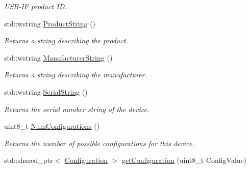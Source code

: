 \begin{DoxyCompactItemize}
\begin{DoxyCompactList}\small\item\em U\-S\-B-\/\-I\-F product I\-D. \end{DoxyCompactList}\item 
\hypertarget{class_lib_u_s_b_1_1_device_a2675fa27b241d017e20a20bd7d7a8af9}{std\-::wstring \hyperlink{class_lib_u_s_b_1_1_device_a2675fa27b241d017e20a20bd7d7a8af9}{Product\-String} ()}\label{class_lib_u_s_b_1_1_device_a2675fa27b241d017e20a20bd7d7a8af9}

\begin{DoxyCompactList}\small\item\em Returns a string describing the product. \end{DoxyCompactList}\item 
\hypertarget{class_lib_u_s_b_1_1_device_a8bdf8188d169b78b6042acdace38029d}{std\-::wstring \hyperlink{class_lib_u_s_b_1_1_device_a8bdf8188d169b78b6042acdace38029d}{Manufacturer\-String} ()}\label{class_lib_u_s_b_1_1_device_a8bdf8188d169b78b6042acdace38029d}

\begin{DoxyCompactList}\small\item\em Returns a string describing the manufacturer. \end{DoxyCompactList}\item 
\hypertarget{class_lib_u_s_b_1_1_device_aab1bf4b42123fe6e83614e49a95c4fcf}{std\-::wstring \hyperlink{class_lib_u_s_b_1_1_device_aab1bf4b42123fe6e83614e49a95c4fcf}{Serial\-String} ()}\label{class_lib_u_s_b_1_1_device_aab1bf4b42123fe6e83614e49a95c4fcf}

\begin{DoxyCompactList}\small\item\em Returns the serial number string of the device. \end{DoxyCompactList}\item 
\hypertarget{class_lib_u_s_b_1_1_device_a38ef4e0bb23c0db89297bbe3f1a7f019}{uint8\-\_\-t \hyperlink{class_lib_u_s_b_1_1_device_a38ef4e0bb23c0db89297bbe3f1a7f019}{Num\-Configurations} ()}\label{class_lib_u_s_b_1_1_device_a38ef4e0bb23c0db89297bbe3f1a7f019}

\begin{DoxyCompactList}\small\item\em Returns the number of possible configurations for this device. \end{DoxyCompactList}\item 
\hypertarget{class_lib_u_s_b_1_1_device_a5ce2cb2d3b4e92fe28f35eb1d5e38b77}{std\-::shared\-\_\-ptr$<$ \hyperlink{class_lib_u_s_b_1_1_configuration}{Configuration} $>$ \hyperlink{class_lib_u_s_b_1_1_device_a5ce2cb2d3b4e92fe28f35eb1d5e38b77}{get\-Configuration} (uint8\-\_\-t Config\-Value)}\label{class_lib_u_s_b_1_1_device_a5ce2cb2d3b4e92fe28f35eb1d5e38b77}


\end{DoxyCompactItemize}
